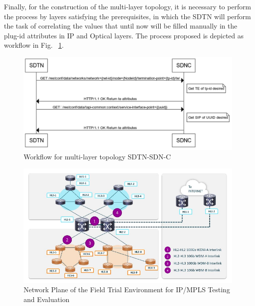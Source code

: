 \documentclass[a4paper,fleqn]{cas-dc}
\begin{document}
Finally, for the construction of the multi-layer topology, it is necessary to perform the process by layers satisfying the prerequisites, in which the SDTN will perform the task of correlating the values that until now will be filled manually in the plug-id attributes in IP and Optical layers. The process proposed is depicted as workflow in Fig. ~\ref{FIG:topology_workflow}.

\begin{figure}
	\centering
		\includegraphics[width=\linewidth]{figs/topology_workflow.png}
	\caption{Workflow for multi-layer topology SDTN-SDN-C}
	\label{FIG:topology_workflow}
\end{figure}

\begin{figure}
	\centering
		\includegraphics[scale=1]{figs/field_trial_environment_ip.pdf}
	\caption{Network Plane of the Field Trial Environment for IP/MPLS Testing and Evaluation}
	\label{FIG:field_trial_ip}
\end{figure}
\end{document}
